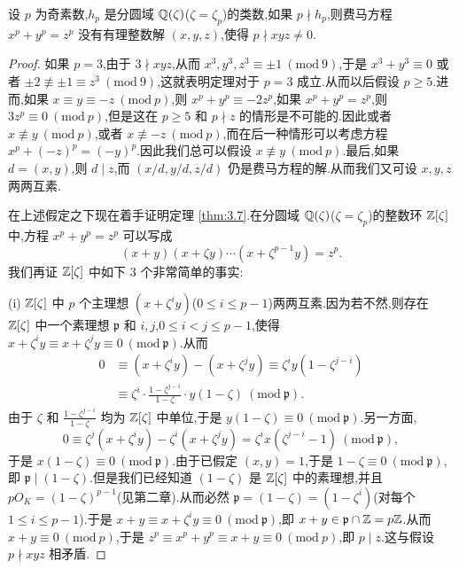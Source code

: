 \begin{theorem}\label{thm:3.7}
设 $p$ 为奇素数,$h_p$ 是分圆域 $\mathbb{Q}(\zeta)$($\zeta=\zeta_p$)的类数,如果 $p\nmid h_p$,则费马方程 $x^p+y^p=z^p$ 没有有理整数解 $(x,y,z)$,使得 $p\nmid xyz\neq 0$.
\end{theorem}

\begin{proof}
如果 $p=3$,由于 $3\nmid xyz$,从而 $x^3,y^3,z^3\equiv\pm1\ (\mathrm{mod}\ 9)$,于是 $x^3+y^3\equiv 0$ 或者 $\pm2\not\equiv\pm1\equiv z^3\ (\mathrm{mod}\ 9)$,这就表明定理对于 $p=3$ 成立.从而以后假设 $p\geqslant 5$.进而,如果 $x\equiv y\equiv -z\ (\mathrm{mod}\ p)$,则 $x^p+y^p\equiv -2z^p$,如果 $x^p+y^p=z^p$,则 $3z^p\equiv 0\ (\mathrm{mod}\ p)$,但是这在 $p\geqslant 5$ 和 $p\nmid z$ 的情形是不可能的.因此或者 $x\not\equiv y\ (\mathrm{mod}\ p)$,或者 $x\not\equiv -z\ (\mathrm{mod}\ p)$,而在后一种情形可以考虑方程 $x^p+(-z)^p=(-y)^p$.因此我们总可以假设 $x\not\equiv y\ (\mathrm{mod}\ p)$.最后,如果 $d=(x,y)$,则 $d\mid z$,而 $(x/d,y/d,z/d)$ 仍是费马方程的解.从而我们又可设 $x,y,z$ 两两互素.

在上述假定之下现在着手证明定理 \ref{thm:3.7}.在分圆域 $\mathbb{Q}(\zeta)$($\zeta=\zeta_p$)的整数环 $\mathbb{Z}[\zeta]$ 中,方程 $x^p+y^p=z^p$ 可以写成
\[
  (x+y)(x+\zeta y)\cdots(x+\zeta^{p-1}y)=z^p.
\]
我们再证 $\mathbb{Z}[\zeta]$ 中如下 $3$ 个非常简单的事实:

(i) $\mathbb{Z}[\zeta]$ 中 $p$ 个主理想 $(x+\zeta^iy)$($0\leqslant i\leqslant p-1$)两两互素.因为若不然,则存在 $\mathbb{Z}[\zeta]$ 中一个素理想 $\mathfrak{p}$ 和 $i,j$,$0\leqslant i<j\leqslant p-1$,使得 $x+\zeta^iy\equiv x+\zeta^jy\equiv 0\ (\mathrm{mod}\ \mathfrak{p})$.从而
\begin{align*}
  0&\equiv(x+\zeta^iy)-(x+\zeta^jy)\equiv\zeta^iy(1-\zeta^{j-i})\\
  &\equiv\zeta^i\cdot\frac{1-\zeta^{j-i}}{1-\zeta}\cdot y(1-\zeta)\ (\mathrm{mod}\ \mathfrak{p}).
\end{align*}
由于 $\zeta$ 和 $\frac{1-\zeta^{j-i}}{1-\zeta}$ 均为 $\mathbb{Z}[\zeta]$ 中单位,于是 $y(1-\zeta)\equiv 0\ (\mathrm{mod}\ \mathfrak{p})$.另一方面,
\[
  0\equiv\zeta^j(x+\zeta^iy)-\zeta^i(x+\zeta^jy)=\zeta^ix(\zeta^{j-i}-1)\ (\mathrm{mod}\ \mathfrak{p}),
\]
于是 $x(1-\zeta)\equiv 0\ (\mathrm{mod}\ \mathfrak{p})$.由于已假定 $(x,y)=1$,于是 $1-\zeta\equiv 0\ (\mathrm{mod}\ \mathfrak{p})$,即 $\mathfrak{p}\mid(1-\zeta)$.但是我们已经知道 $(1-\zeta)$ 是 $\mathbb{Z}[\zeta]$ 中的素理想,并且 $pO_K=(1-\zeta)^{p-1}$(见第二章).从而必然 $\mathfrak{p}=(1-\zeta)=(1-\zeta^i)$(对每个 $1\leqslant i\leqslant p-1$).于是 $x+y\equiv x+\zeta^iy\equiv 0\ (\mathrm{mod}\ \mathfrak{p})$,即 $x+y\in\mathfrak{p}\cap\mathbb{Z}=p\mathbb{Z}$.从而 $x+y\equiv 0\ (\mathrm{mod}\ p)$,于是 $z^p\equiv x^p+y^p\equiv x+y\equiv 0\ (\mathrm{mod}\ p)$,即 $p\mid z$.这与假设 $p\nmid xyz$ 相矛盾.


\end{proof}

